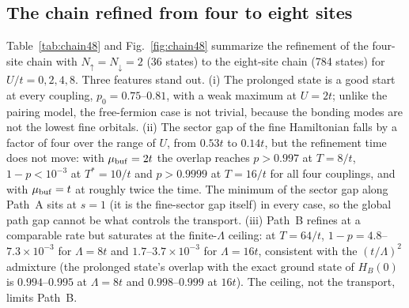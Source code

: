 \documentclass[a4paper,11pt,noarxiv]{quantumarticle}
\begin{document}
\subsection{The chain refined from four to eight sites}
\label{sec:chain48}
Table~\ref{tab:chain48} and Fig.~\ref{fig:chain48} summarize the refinement
of the four-site chain with $N_\uparrow=N_\downarrow=2$ (36 states) to the
eight-site chain (784 states) for $U/t=0,2,4,8$.  Three features stand out.
(i) The prolonged state is a good start at every coupling, $p_0=0.75$--$0.81$,
with a weak maximum at $U=2t$; unlike the pairing model, the free-fermion
case is not trivial, because the bonding modes are not the lowest fine
orbitals.  (ii) The sector gap of the fine Hamiltonian falls by a factor of
four over the range of $U$, from $0.53t$ to $0.14t$, but the refinement time
does not move: with $\mu_{\rm buf}=2t$ the overlap reaches $p>0.997$ at
$T=8/t$, $1-p<10^{-3}$ at $T^*=10/t$ and $p>0.9999$ at $T=16/t$ for all
four couplings, and with $\mu_{\rm buf}=t$ at roughly twice the time.  The
minimum of the sector gap along Path~A sits at $s=1$ (it is the fine-sector
gap itself) in every case, so the global path gap cannot be what controls
the transport.  (iii) Path~B refines at a comparable rate but saturates at
the finite-$\Lambda$ ceiling: at $T=64/t$, $1-p=4.8$--$7.3\times10^{-3}$ for
$\Lambda=8t$ and $1.7$--$3.7\times10^{-3}$ for $\Lambda=16t$, consistent with
the $(t/\Lambda)^2$ admixture (the prolonged state's overlap with the exact
ground state of $H_B(0)$ is $0.994$--$0.995$ at $\Lambda=8t$ and
$0.998$--$0.999$ at $16t$).  The ceiling, not the transport, limits Path~B.
\end{document}
